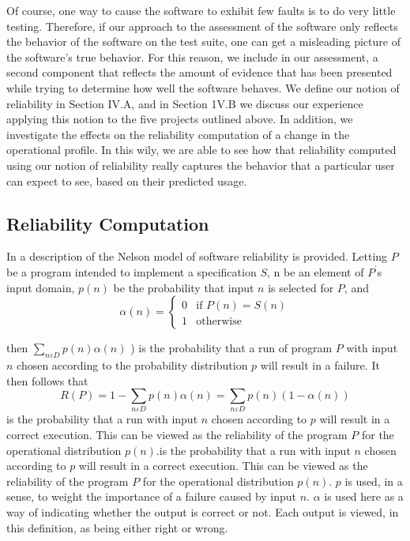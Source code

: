 \documentclass[journal, twoside]{IEEEtran}
\begin{document}
Of course, one way to cause the software to exhibit few
faults is to do very little testing. Therefore, if our approach to
the assessment of the software only reflects the behavior of the
software on the test suite, one can get a misleading picture of
the software’s true behavior. For this reason, we include in our
assessment, a second component that reflects the amount of
evidence that has been presented while trying to determine
how well the software behaves. We define our notion of reliability in Section IV.A, and in Section 1V.B we discuss our
experience applying this notion to the five projects outlined
above. In addition, we investigate the effects on the reliability
computation of a change in the operational profile. In this wily,
we are able to see how that reliability computed using our notion of reliability really captures the behavior that a particular
user can expect to see, based on their predicted usage. 

\subsection{Reliability Computation}
In \cite{b8} a description of the Nelson model of software reliability is provided. Letting $P$ be a program intended to implement a specification $S$, n be an element of $P^’$s input domain,
$p(n)$ be the probability that input $n$ is selected for $P$, and
\begin{equation*}
    \alpha(n) = 
\begin{cases}
    0& \text{if } P(n) = S(n) \\
    1              & \text{otherwise}
\end{cases}
\end{equation*}

then $\sum_{n\varepsilon D} p(n) \alpha(n)$ ) is the probability that a run of program $P$
with input $n$ chosen according to the probability distribution $p$
will result in a failure. It then follows that 
\vspace{3cm}
\begin{equation*}
    R(P)=1-\sum_{n\varepsilon D}p(n)\alpha(n) = \sum_{n\varepsilon D}p(n)(1-\alpha(n)) 
\end{equation*}
is the probability that a run with input $n$ chosen according to $p$
will result in a correct execution. This can be viewed as the
reliability of the program $P$ for the operational distribution $p(n)$.is the probability that a run with input $n$ chosen according to $p$
will result in a correct execution. This can be viewed as the
reliability of the program $P$ for the operational distribution
$p(n)$. $p$ is used, in a sense, to weight the importance of a failure
caused by input $n$. $\alpha$ is used here as a way of indicating
whether the output is correct or not. Each output is viewed, in
this definition, as being either right or wrong.
\end{document}
